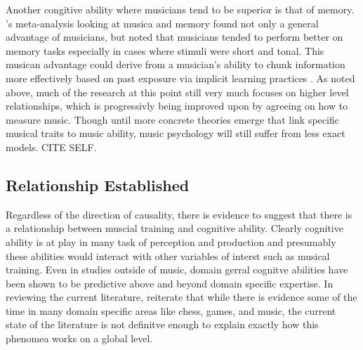 \documentclass[]{book}
\begin{document}
Another congitive ability where musicians tend to be superior is that of memory.
\citep{talaminiMusiciansHaveBetter2017}'s meta-analysis looking at musica and memory found not only a general advantage of musicians, but noted that musicians tended to perform better on memory tasks especially in cases where stimuli were short and tonal.
This musican advantage could derive from a musician's ability to chunk information more effectively based on past exposure via implicit learning practices \citep{ettlingerImplicitMemoryMusic2011, rohrmeierImplicitLearningAcquisition2012}.
As noted above, much of the research at this point still very much focuses on higher level relationships, which is progressivly being improved upon by agreeing on how to measure music.
Though until more concrete theories emerge that link specific musical traits to music ability, music psychology will still suffer from less exact models. CITE SELF.

\hypertarget{relationship-established}{%
\subsection{Relationship Established}\label{relationship-established}}

Regardless of the direction of causality, there is evidence to suggest that there is a relationship between muscial training and cognitive ability.
Clearly cognitive ability is at play in many task of perception and production and presumably these abilities would interact with other variables of interst such as musical training.
Even in studies outside of music, domain gerral cognitve abilities have been shown to be predictive above and beyond domain specific expertise.
In reviewing the current literature, \citep{hambrickDomainGeneralModelsExpertise2019} reiterate that while there is evidence some of the time in many domain specific areas like chess, games, and music, the current state of the literature is not definitve enough to explain exactly how this phenomea works on a global level.
\end{document}
